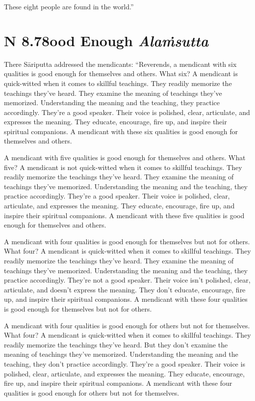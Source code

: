\documentclass[12pt,openany]{book}%
\newcommand*{\suttatitleacronym}[1]{\smaller[2]{#1}\vspace*{.3em}}
\newcommand*{\suttatitletranslation}[1]{\linebreak{#1}}
\newcommand*{\suttatitleroot}[1]{\linebreak\smaller[2]\itshape{#1}}
\newcommand*{\tocacronym}[1]{\hspace*{-3.3em}{#1}\quad}
\newcommand*{\toctranslation}[1]{#1}
\newcommand*{\tocroot}[1]{(\textit{#1})}
\begin{document}
These eight people are found in the world.” 

%
\section*{{\suttatitleacronym AN 8.78}{\suttatitletranslation Good Enough }{\suttatitleroot Alaṁsutta}}
\addcontentsline{toc}{section}{\tocacronym{AN 8.78} \toctranslation{Good Enough } \tocroot{Alaṁsutta}}

There \textsanskrit{Sāriputta} addressed the mendicants: “Reverends, a mendicant with six qualities is good enough for themselves and others. What six? A mendicant is quick-witted when it comes to skillful teachings. They readily memorize the teachings they’ve heard. They examine the meaning of teachings they’ve memorized. Understanding the meaning and the teaching, they practice accordingly. They’re a good speaker. Their voice is polished, clear, articulate, and expresses the meaning. They educate, encourage, fire up, and inspire their spiritual companions. A mendicant with these six qualities is good enough for themselves and others. 

A mendicant with five qualities is good enough for themselves and others. What five? A mendicant is not quick-witted when it comes to skillful teachings. They readily memorize the teachings they’ve heard. They examine the meaning of teachings they’ve memorized. Understanding the meaning and the teaching, they practice accordingly. They’re a good speaker. Their voice is polished, clear, articulate, and expresses the meaning. They educate, encourage, fire up, and inspire their spiritual companions. A mendicant with these five qualities is good enough for themselves and others. 

A mendicant with four qualities is good enough for themselves but not for others. What four? A mendicant is quick-witted when it comes to skillful teachings. They readily memorize the teachings they’ve heard. They examine the meaning of teachings they’ve memorized. Understanding the meaning and the teaching, they practice accordingly. They’re not a good speaker. Their voice isn’t polished, clear, articulate, and doesn’t express the meaning. They don’t educate, encourage, fire up, and inspire their spiritual companions. A mendicant with these four qualities is good enough for themselves but not for others. 

A mendicant with four qualities is good enough for others but not for themselves. What four? A mendicant is quick-witted when it comes to skillful teachings. They readily memorize the teachings they’ve heard. But they don’t examine the meaning of teachings they’ve memorized. Understanding the meaning and the teaching, they don’t practice accordingly. They’re a good speaker. Their voice is polished, clear, articulate, and expresses the meaning. They educate, encourage, fire up, and inspire their spiritual companions. A mendicant with these four qualities is good enough for others but not for themselves. 
\end{document}
